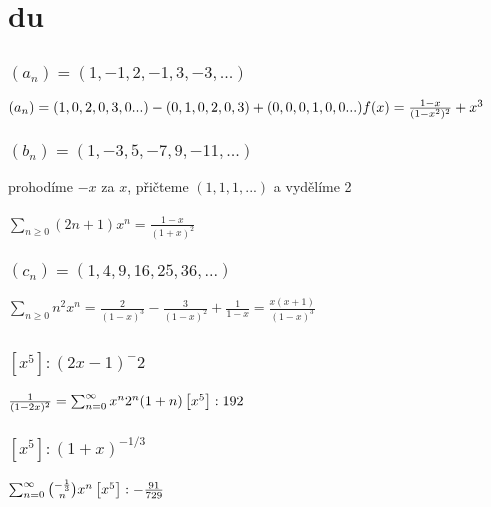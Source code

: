 \documentclass[a4paper]{article}
\begin{document}
\pagestyle{fancy}

\section{du}
\subsection{}
\subsubsection{$(a_n) = (1, -1, 2, -1, 3, -3, ...)$}
$
(a_n) = (1, 0, 2, 0, 3, 0 ...) - (0, 1, 0, 2, 0, 3) + (0, 0, 0, 1, 0, 0 ...)\\
f(x) = 	\frac{1-x}{(1-x^2)^2} + x^3	
$

\subsubsection{$(b_n) = (1, -3, 5, -7, 9, -11, ...)$}
prohodíme $-x$ za $x$, přičteme $(1, 1, 1, ...)$ a vydělíme 2
\\ \\
$
\sum_{n \geq 0}(2n + 1)x^n = 
\frac{1-x}{(1+x)^2}
$


\subsubsection{$(c_n) = (1, 4, 9, 16, 25, 36, ...)$}
$
\sum_{n \geq 0} n^2 x^n =
\frac{2}{(1-x)^3} - \frac{3}{(1-x)^2} + \frac{1}{1-x} = 
\frac{x(x+1)}{(1-x)^3}
$

\subsection{}
\subsubsection{$[x^5] : (2x - 1)^-2$}
$
\frac{1}{(1-2x)^2}=
\sum_{n=0}^\infty x^n 2^n (1+n)
\\ \\
\left[ x^5 \right] : 192
$

\subsubsection{$[x^5] : (1 + x)^{-1/3}$}
$
\sum_{n=0}^\infty \binom{-\frac{1}{3}}{n} x^n
\\ \\
\left[ x^5 \right] : -\frac{91}{729}
$
\end{document}
